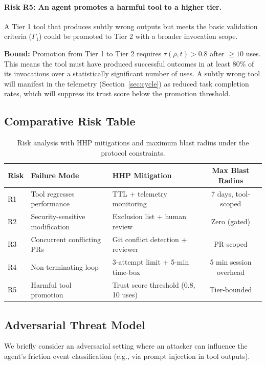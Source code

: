 \documentclass[11pt]{article}
\begin{document}
\paragraph{Risk R5: An agent promotes a harmful tool to a higher tier.}
A Tier 1 tool that produces subtly wrong outputs but meets the basic validation
criteria ($\Gamma_1$) could be promoted to Tier 2 with a broader invocation scope.

\textbf{Bound:} Promotion from Tier 1 to Tier 2 requires $\tau(\rho, t) > 0.8$
after $\geq 10$ uses. This means the tool must have produced successful outcomes
in at least 80\% of its invocations over a statistically significant number of
uses. A subtly wrong tool will manifest in the telemetry (Section~\ref{sec:cycle})
as reduced task completion rates, which will suppress its trust score below the
promotion threshold.

\subsection{Comparative Risk Table}
\label{sec:risk-table}

\begin{table}[H]
\centering
\begin{tabularx}{\textwidth}{l X X c}
\toprule
Risk & Failure Mode & HHP Mitigation & Max Blast Radius \\
\midrule
R1 & Tool regresses performance & TTL + telemetry monitoring & 7 days, tool-scoped \\
R2 & Security-sensitive modification & Exclusion list + human review & Zero (gated) \\
R3 & Concurrent conflicting PRs & Git conflict detection + reviewer & PR-scoped \\
R4 & Non-terminating loop & 3-attempt limit + 5-min time-box & 5 min session overhead \\
R5 & Harmful tool promotion & Trust score threshold (0.8, 10 uses) & Tier-bounded \\
\bottomrule
\end{tabularx}
\caption{Risk analysis with HHP mitigations and maximum blast radius under
the protocol constraints.}
\label{tab:risks}
\end{table}

\subsection{Adversarial Threat Model}
\label{sec:adversarial}

We briefly consider an adversarial setting where an attacker can influence the
agent's friction event classification (e.g., via prompt injection in tool outputs).
\end{document}
